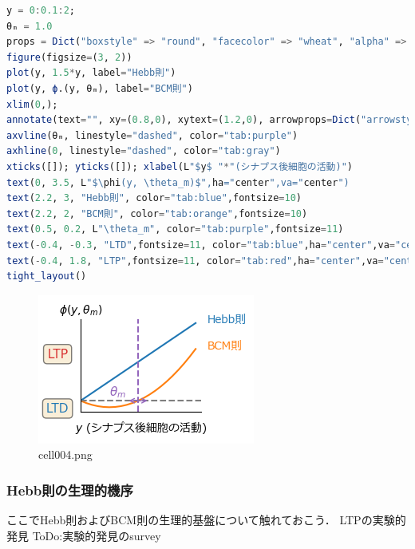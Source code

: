 \begin{lstlisting}[language=julia]
y = 0:0.1:2;
θₘ = 1.0
props = Dict("boxstyle" => "round", "facecolor" => "wheat", "alpha" => 0.5)
figure(figsize=(3, 2))
plot(y, 1.5*y, label="Hebb則")
plot(y, ϕ.(y, θₘ), label="BCM則")
xlim(0,);
annotate(text="", xy=(0.8,0), xytext=(1.2,0), arrowprops=Dict("arrowstyle" => "<->", "color" => "tab:purple"))
axvline(θₘ, linestyle="dashed", color="tab:purple")
axhline(0, linestyle="dashed", color="tab:gray")
xticks([]); yticks([]); xlabel(L"$y$ "*"(シナプス後細胞の活動)")
text(0, 3.5, L"$\phi(y, \theta_m)$",ha="center",va="center")
text(2.2, 3, "Hebb則", color="tab:blue",fontsize=10)
text(2.2, 2, "BCM則", color="tab:orange",fontsize=10)
text(0.5, 0.2, L"\theta_m", color="tab:purple",fontsize=11)
text(-0.4, -0.3, "LTD",fontsize=11, color="tab:blue",ha="center",va="center", bbox=props);
text(-0.4, 1.8, "LTP",fontsize=11, color="tab:red",ha="center",va="center", bbox=props);
tight_layout()
\end{lstlisting}
\begin{figure}[ht]
	\centering
	\includegraphics[scale=0.8, max width=\linewidth]{./fig/local-learning-rule/pca-hebbian-learning/cell004.png}
	\caption{cell004.png}
	\label{cell004.png}
\end{figure}
\subsubsection{Hebb則の生理的機序}
ここでHebb則およびBCM則の生理的基盤について触れておこう．
LTPの実験的発見 \citep{Bliss1973-vj} \citep{Dudek1992-nz}
ToDo:実験的発見のsurvey
